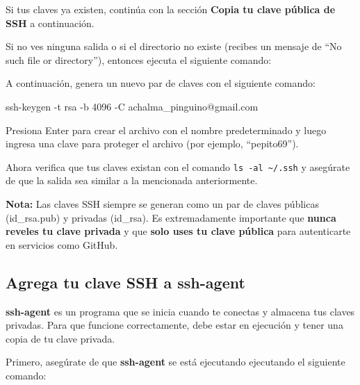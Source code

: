 \documentclass[
  a4paper,
]{article}
\newenvironment{Shaded}{}{}
\newcommand{\AttributeTok}[1]{\textcolor[rgb]{0.84,0.23,0.29}{#1}}
\newcommand{\BuiltInTok}[1]{\textcolor[rgb]{0.84,0.23,0.29}{#1}}
\newcommand{\CommentTok}[1]{\textcolor[rgb]{0.42,0.45,0.49}{#1}}
\newcommand{\FunctionTok}[1]{\textcolor[rgb]{0.44,0.26,0.76}{#1}}
\newcommand{\NormalTok}[1]{\textcolor[rgb]{0.14,0.16,0.18}{#1}}
\newcommand{\StringTok}[1]{\textcolor[rgb]{0.01,0.18,0.38}{#1}}
\newcommand{\VariableTok}[1]{\textcolor[rgb]{0.89,0.38,0.04}{#1}}
\begin{document}
Si tus claves ya existen, continúa con la sección \textbf{Copia tu clave
pública de SSH} a continuación.

Si no ves ninguna salida o si el directorio no existe (recibes un
mensaje de ``No such file or directory''), entonces ejecuta el siguiente
comando:

\begin{Shaded}
\end{Shaded}

A continuación, genera un nuevo par de claves con el siguiente comando:

\begin{Shaded}
\begin{Highlighting}[]
\FunctionTok{ssh{-}keygen} \AttributeTok{{-}t}\NormalTok{ rsa }\AttributeTok{{-}b}\NormalTok{ 4096 }\AttributeTok{{-}C}\NormalTok{ achalma\_pinguino@gmail.com}
\end{Highlighting}
\end{Shaded}

Presiona Enter para crear el archivo con el nombre predeterminado y
luego ingresa una clave para proteger el archivo (por ejemplo,
``pepito69'').

Ahora verifica que tus claves existan con el comando
\texttt{ls\ -al\ \textasciitilde{}/.ssh} y asegúrate de que la salida
sea similar a la mencionada anteriormente.

\textbf{Nota:} Las claves SSH siempre se generan como un par de claves
públicas (id\_rsa.pub) y privadas (id\_rsa). Es extremadamente
importante que \textbf{nunca reveles tu clave privada} y que
\textbf{solo uses tu clave pública} para autenticarte en servicios como
GitHub.

\subsection{Agrega tu clave SSH a
ssh-agent}\label{agrega-tu-clave-ssh-a-ssh-agent}

\textbf{ssh-agent} es un programa que se inicia cuando te conectas y
almacena tus claves privadas. Para que funcione correctamente, debe
estar en ejecución y tener una copia de tu clave privada.

Primero, asegúrate de que \textbf{ssh-agent} se está ejecutando
ejecutando el siguiente comando:

\begin{Shaded}
\end{Shaded}
\end{document}
